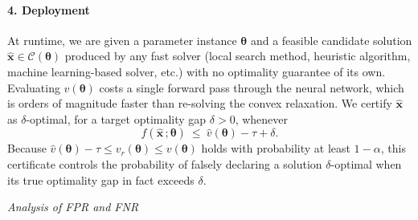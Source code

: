 \documentclass[10pt]{article} %
\theoremstyle{plain}
\theoremstyle{definition}
\theoremstyle{remark}
\begin{document}
\begin{tcolorbox}
\paragraph{4. Deployment} At runtime, we are given a parameter instance $\bm{\theta}$ and a feasible candidate solution $\hat{\mathbf{x}} \in \mathcal{C}(\bm{\theta})$ produced by any fast solver (local search method, heuristic algorithm, machine learning-based solver, etc.) with no optimality guarantee of its own. Evaluating $\hat{v}(\bm{\theta})$ costs a single forward pass through the neural network, which is orders of magnitude faster than re-solving the convex relaxation. We certify $\hat{\mathbf{x}}$ as $\delta$-optimal, for a target optimality gap $\delta > 0$, whenever
\begin{equation*}
    f(\hat{\mathbf{x}}\, ; \bm{\theta}) ~\leq~ \hat{v}(\bm{\theta}) - \tau + \delta.
\end{equation*}
Because $\hat{v}(\bm{\theta}) - \tau \leq v_r(\bm{\theta}) \leq v(\bm{\theta})$ holds with probability at least $1 - \alpha$, this certificate controls the probability of falsely declaring a solution $\delta$-optimal when its true optimality gap in fact exceeds $\delta$.

\end{tcolorbox}

\textit{Analysis of FPR and FNR}
\end{document}
